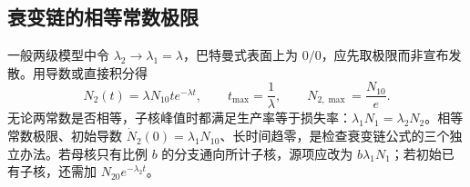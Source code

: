 \subsection{衰变链的相等常数极限}
一般两级模型中令 $\lambda_2\to\lambda_1=\lambda$，巴特曼式表面上为 $0/0$，应先取极限而非宣布发散。用导数或直接积分得
\[
 N_2(t)=\lambda N_{10}t e^{-\lambda t},\qquad
 t_{\max}=\frac1\lambda,\qquad N_{2,\max}=\frac{N_{10}}e.
\]
无论两常数是否相等，子核峰值时都满足生产率等于损失率：$\lambda_1N_1=\lambda_2N_2$。相等常数极限、初始导数 $\dot N_2(0)=\lambda_1N_{10}$、长时间趋零，是检查衰变链公式的三个独立办法。若母核只有比例 $b$ 的分支通向所计子核，源项应改为 $b\lambda_1N_1$；若初始已有子核，还需加 $N_{20}e^{-\lambda_2t}$。
